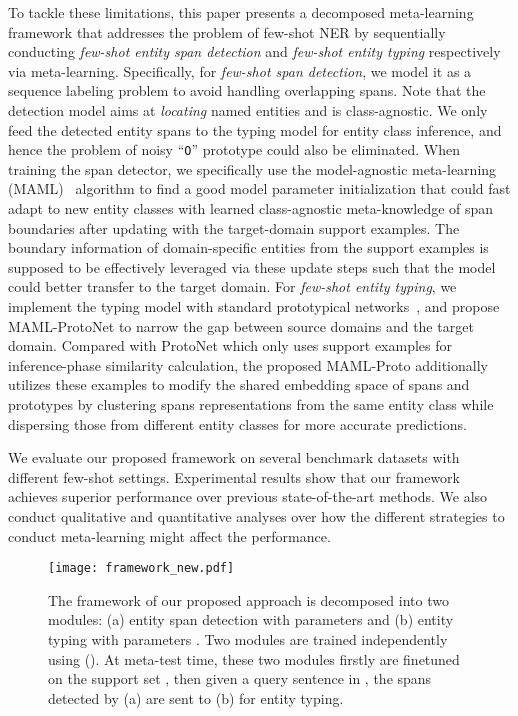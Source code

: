 \documentclass[11pt]{article}
\begin{document}
To tackle these limitations, this paper presents a decomposed meta-learning framework that addresses the problem of few-shot NER by sequentially conducting \textit{few-shot entity span detection} and \textit{few-shot entity typing} respectively via meta-learning.
Specifically, for \emph{few-shot span detection}, we model it as a sequence labeling problem to avoid handling overlapping spans.
Note that the detection model aims at \emph{locating} named entities and is class-agnostic.
We only feed the detected entity spans to the typing model for entity class inference,
and hence the problem of noisy ``\texttt{O}'' prototype could also be eliminated.
When training the span detector, 
we specifically use the model-agnostic meta-learning (MAML)~\citep{finn2017model} algorithm to find a good model parameter initialization
that could fast adapt to new entity classes
with learned class-agnostic meta-knowledge of span boundaries
after updating with the target-domain support examples.
The boundary information of domain-specific entities from the support examples is supposed to be effectively leveraged via these update steps such that the model could better transfer to the target domain.
For \emph{few-shot entity typing}, we
implement the typing model with standard prototypical networks~\citep[ProtoNet]{snell2017proto},
and propose MAML-ProtoNet to narrow the gap between source domains and the target domain.
Compared with ProtoNet which only uses support examples for inference-phase similarity calculation, the proposed MAML-Proto additionally utilizes these examples to modify the shared embedding space of spans and prototypes by clustering spans representations from the same entity class while dispersing those from different entity classes for more accurate predictions.




We evaluate our proposed framework on several benchmark datasets with different few-shot settings.
Experimental results show that our framework achieves superior performance over previous state-of-the-art methods.
We also conduct qualitative and quantitative analyses 
over how the different strategies to conduct meta-learning might affect the performance.





\begin{figure*}[t]
    \centering
    \texttt{[image: framework\_new.pdf]}
    \caption{The framework of our proposed approach is decomposed into two modules: (a) entity span detection with parameters  and (b) entity typing with parameters . Two modules are trained independently using (). At meta-test time, these two modules firstly are finetuned on the support set , then given a query sentence in , the spans detected by (a) are sent to (b) for entity typing.}
    \label{fig:framework}
\end{figure*}
\end{document}
